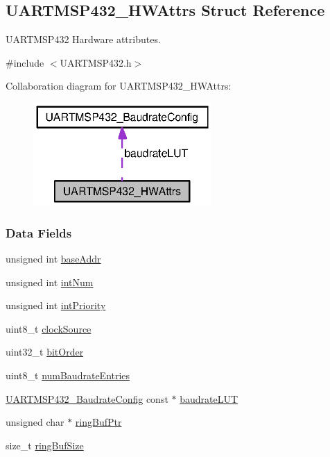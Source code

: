 \subsection{U\+A\+R\+T\+M\+S\+P432\+\_\+\+H\+W\+Attrs Struct Reference}
\label{struct_u_a_r_t_m_s_p432___h_w_attrs}


U\+A\+R\+T\+M\+S\+P432 Hardware attributes.  




{\ttfamily \#include $<$U\+A\+R\+T\+M\+S\+P432.\+h$>$}



Collaboration diagram for U\+A\+R\+T\+M\+S\+P432\+\_\+\+H\+W\+Attrs\+:
\nopagebreak
\begin{figure}[H]
\begin{center}
\leavevmode
\includegraphics[width=193pt]{struct_u_a_r_t_m_s_p432___h_w_attrs__coll__graph}
\end{center}
\end{figure}
\subsubsection*{Data Fields}
\begin{DoxyCompactItemize}
\item 
unsigned int \hyperlink{struct_u_a_r_t_m_s_p432___h_w_attrs_a3ac9284cf6c983c0e6d06c913cb3f8fb}{base\+Addr}
\item 
unsigned int \hyperlink{struct_u_a_r_t_m_s_p432___h_w_attrs_acb0e04c3738195c0cebbe0cc14c99690}{int\+Num}
\item 
unsigned int \hyperlink{struct_u_a_r_t_m_s_p432___h_w_attrs_a977f993c696b57397f56405e4ecb9be6}{int\+Priority}
\item 
uint8\+\_\+t \hyperlink{struct_u_a_r_t_m_s_p432___h_w_attrs_a22ca5e160df007a74cfa304adf69d893}{clock\+Source}
\item 
uint32\+\_\+t \hyperlink{struct_u_a_r_t_m_s_p432___h_w_attrs_a6a67f0ec8bba9bf2cd3ff6532d8225d4}{bit\+Order}
\item 
uint8\+\_\+t \hyperlink{struct_u_a_r_t_m_s_p432___h_w_attrs_a0908dc397eb5bea6958cf3e4d29d82d7}{num\+Baudrate\+Entries}
\item 
\hyperlink{struct_u_a_r_t_m_s_p432___baudrate_config}{U\+A\+R\+T\+M\+S\+P432\+\_\+\+Baudrate\+Config} const $\ast$ \hyperlink{struct_u_a_r_t_m_s_p432___h_w_attrs_a1752fdae9f05081ab11d72357f3faaa5}{baudrate\+L\+U\+T}
\item 
unsigned char $\ast$ \hyperlink{struct_u_a_r_t_m_s_p432___h_w_attrs_a6c07951f956137b108d8deb56a941162}{ring\+Buf\+Ptr}
\item 
size\+\_\+t \hyperlink{struct_u_a_r_t_m_s_p432___h_w_attrs_a345815030a7e198c64cefee76189dcf9}{ring\+Buf\+Size}
\end{DoxyCompactItemize}


